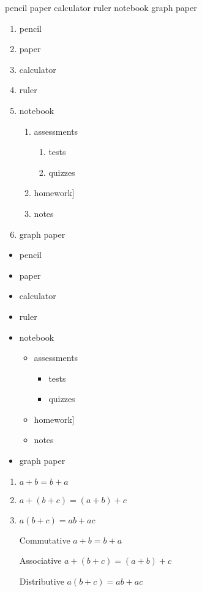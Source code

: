 \documentclass[11pt]{article}
\begin{document}
pencil
paper
calculator
ruler
notebook
graph paper

\begin{enumerate}
\item pencil
\item paper
\item calculator
\item ruler
\item notebook
	\begin{enumerate}
	\item assessments
		\begin{enumerate}
		\item tests
		\item quizzes
		\end{enumerate}
	\item homework]
	\item notes
	\end{enumerate}
\item graph paper
\end{enumerate}

\begin{itemize}

\item pencil
\item paper
\item calculator
\item ruler
\item notebook
	\begin{itemize}
	\item assessments
		\begin{itemize}
		\item tests
		\item quizzes
		\end{itemize}
	\item homework]
	\item notes
	\end{itemize}
\item graph paper
\end{itemize}

\begin{enumerate}
\item $a+b=b+a$
\item $a+(b+c)=(a+b)+c$
\item $a(b+c)=ab+ac$
\end{enumerate}

\begin{enumerate}
\item[Commutative] $a+b=b+a$
\item[Associative] $a+(b+c)=(a+b)+c$
\item[Distributive] $a(b+c)=ab+ac$
\end{enumerate}
\end{document}

